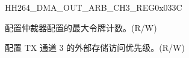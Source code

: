 \begin{register}{H}{H264\_DMA\_OUT\_ARB\_CH3\_REG}{0x033C}\label{regdesc:H264DMAOUTARBCH3REG}
%
%
%
\regnewline%
\begin{regdesc}\begin{reglist}
\label{fielddesc:H264DMAOUTARBTOKENNUMCH3}\item [H264\_DMA\_OUT\_ARB\_TOKEN\_NUM\_CH3] 配置仲裁器配置的最大令牌计数。(R/W)
\label{fielddesc:H264DMAEXTEROUTARBPRIORITYCH3}\item [H264\_DMA\_EXTER\_OUT\_ARB\_PRIORITY\_CH3] 配置 TX 通道 3 的外部存储访问优先级。(R/W)
\end{reglist}\end{regdesc}
\end{register}




